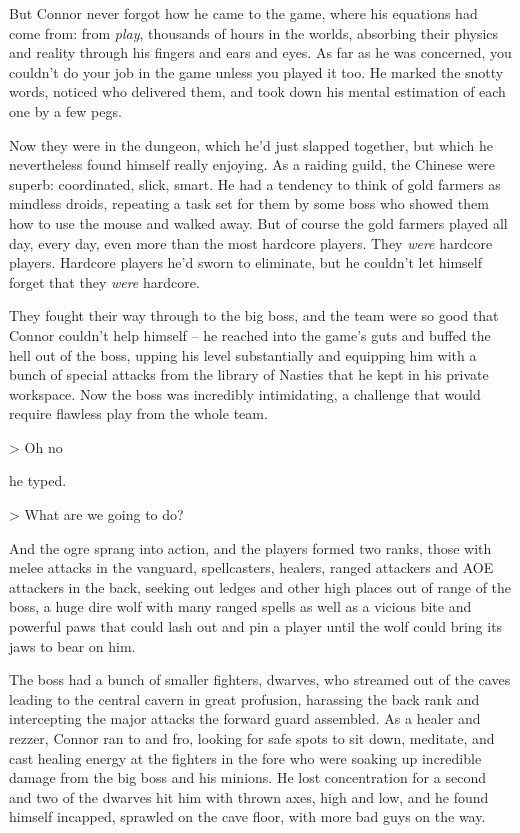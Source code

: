 But Connor never forgot how he came to the game, where his
equations had come from: from \emph{play}, thousands of hours in
the worlds, absorbing their physics and reality through his fingers
and ears and eyes. As far as he was concerned, you couldn't do your
job in the game unless you played it too. He marked the snotty
words, noticed who delivered them, and took down his mental
estimation of each one by a few pegs.

Now they were in the dungeon, which he'd just slapped together, but
which he nevertheless found himself really enjoying. As a raiding
guild, the Chinese were superb: coordinated, slick, smart. He had a
tendency to think of gold farmers as mindless droids, repeating a
task set for them by some boss who showed them how to use the mouse
and walked away. But of course the gold farmers played all day,
every day, even more than the most hardcore players. They
\emph{were} hardcore players. Hardcore players he'd sworn to
eliminate, but he couldn't let himself forget that they \emph{were}
hardcore.

They fought their way through to the big boss, and the team were so
good that Connor couldn't help himself -- he reached into the
game's guts and buffed the hell out of the boss, upping his level
substantially and equipping him with a bunch of special attacks
from the library of Nasties that he kept in his private workspace.
Now the boss was incredibly intimidating, a challenge that would
require flawless play from the whole team.

\textgreater{} Oh no

he typed.

\textgreater{} What are we going to do?

And the ogre sprang into action, and the players formed two ranks,
those with melee attacks in the vanguard, spellcasters, healers,
ranged attackers and AOE attackers in the back, seeking out ledges
and other high places out of range of the boss, a huge dire wolf
with many ranged spells as well as a vicious bite and powerful paws
that could lash out and pin a player until the wolf could bring its
jaws to bear on him.

The boss had a bunch of smaller fighters, dwarves, who streamed out
of the caves leading to the central cavern in great profusion,
harassing the back rank and intercepting the major attacks the
forward guard assembled. As a healer and rezzer, Connor ran to and
fro, looking for safe spots to sit down, meditate, and cast healing
energy at the fighters in the fore who were soaking up incredible
damage from the big boss and his minions. He lost concentration for
a second and two of the dwarves hit him with thrown axes, high and
low, and he found himself incapped, sprawled on the cave floor,
with more bad guys on the way.

